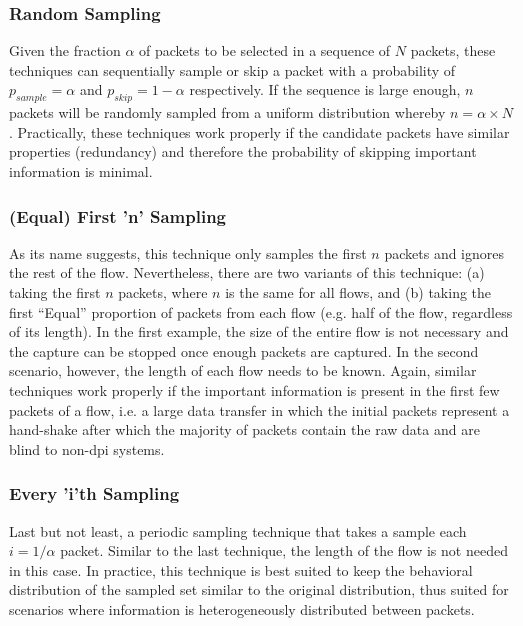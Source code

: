 \documentclass[conference]{IEEEtran}
\begin{document}
\subsubsection{Random Sampling}

Given the fraction $\alpha$ of packets to be selected in a sequence of $N$ packets, these techniques can sequentially sample or skip a packet with a probability of $p_{sample}=\alpha$ and $p_{skip}=1-\alpha$ respectively. If the sequence is large enough, $n$ packets will be randomly sampled from a uniform distribution whereby $n= \alpha \times N$. Practically, these techniques work properly if the candidate packets have similar properties (redundancy) and therefore the probability of skipping important information is minimal.

\subsubsection{(Equal) First 'n' Sampling}
As its name suggests, this technique only samples the first $n$ packets and ignores the rest of the flow. Nevertheless, there are two variants of this technique: (a) taking the first $n$ packets, where $n$ is the same for all flows, and (b) taking the first ``Equal'' proportion of packets from each flow (e.g. half of the flow, regardless of its length). In the first example, the size of the entire flow is not necessary and the capture can be stopped once enough packets are captured. In the second scenario, however, the length of each flow needs to be known. Again, similar techniques work properly if the important information is present in the first few packets of a flow, i.e. a large data transfer in which the initial packets represent a hand-shake after which the majority of packets contain the raw data and are blind to non-\gls{dpi} systems. 

\subsubsection{Every 'i'th Sampling}
Last but not least, a periodic sampling technique that takes a sample each $i= 1/ \alpha$ packet. Similar to the last technique, the length of the flow is not needed in this case. In practice, this technique is best suited to keep the behavioral distribution of the sampled set similar to the original distribution, thus suited for scenarios where information is heterogeneously distributed between packets.
\end{document}
